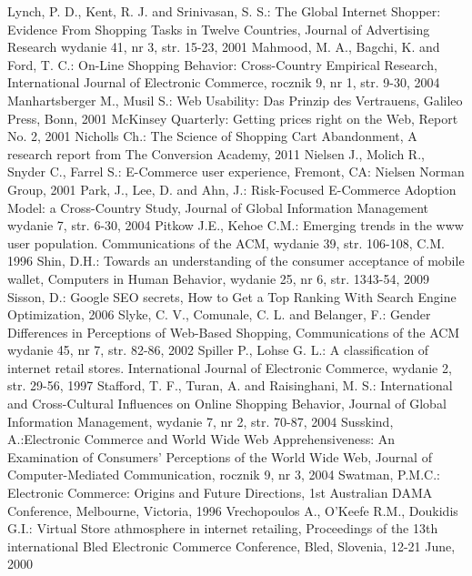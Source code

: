 {\begin{thebibliography}{40}
     {Lynch, P. D., Kent, R. J. and Srinivasan, S. S.: The Global Internet Shopper: Evidence From Shopping Tasks in Twelve Countries, Journal of Advertising Research wydanie 41, nr 3, str. 15-23, 2001}
     {Mahmood, M. A., Bagchi, K. and Ford, T. C.: On-Line Shopping Behavior: Cross-Country Empirical Research, International Journal of Electronic Commerce, rocznik 9, nr 1, str. 9-30, 2004}
     {Manhartsberger M., Musil S.: Web Usability: Das Prinzip des Vertrauens, Galileo Press, Bonn, 2001}
     {McKinsey Quarterly: Getting prices right on the Web, Report No. 2, 2001}
     {Nicholls Ch.: The Science of Shopping Cart Abandonment, A research report from The Conversion Academy, 2011}
     {Nielsen J., Molich R., Snyder C., Farrel S.: E-Commerce user experience, Fremont, CA: Nielsen Norman Group, 2001}
     Park, J., Lee, D. and Ahn, J.: Risk-Focused E-Commerce Adoption Model: a Cross-Country Study, Journal of Global Information Management wydanie 7, str. 6-30, 2004
     Pitkow J.E., Kehoe C.M.: Emerging trends in the www user population. Communications of the ACM, wydanie 39, str. 106-108, C.M. 1996
     Shin, D.H.: Towards an understanding of the consumer acceptance of mobile wallet,
Computers in Human Behavior, wydanie 25, nr 6, str. 1343-54, 2009
     Sisson, D.: Google SEO secrets, How to Get a Top Ranking With Search Engine Optimization, 2006
     Slyke, C. V., Comunale, C. L. and Belanger, F.: Gender Differences in Perceptions of Web-Based Shopping, Communications of the ACM wydanie 45, nr 7, str. 82-86, 2002
     Spiller P., Lohse G. L.: A classification of internet retail stores. International Journal of Electronic Commerce, wydanie 2, str. 29-56, 1997
     Stafford, T. F., Turan, A. and Raisinghani, M. S.: International and Cross-Cultural Influences on Online Shopping Behavior, Journal of Global Information Management, wydanie 7, nr 2, str. 70-87, 2004
     Susskind, A.:Electronic Commerce and World Wide Web Apprehensiveness: An Examination of Consumers' Perceptions of the World Wide Web, Journal of Computer-Mediated Communication, rocznik 9, nr 3, 2004
     Swatman, P.M.C.: Electronic Commerce: Origins and Future Directions, 1st
Australian DAMA Conference, Melbourne, Victoria, 1996
     Vrechopoulos A., O'Keefe R.M., Doukidis G.I.: Virtual Store athmosphere in internet retailing, Proceedings of the 13th international Bled Electronic Commerce Conference, Bled, Slovenia, 12-21 June, 2000

\end{thebibliography}}
